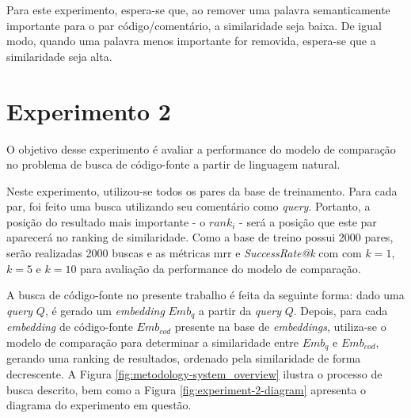 Para este experimento, espera-se que, ao remover uma palavra semanticamente importante para o par código/comentário, a similaridade seja baixa. De igual modo, quando uma palavra menos importante for removida, espera-se que a similaridade seja alta.

\section{Experimento 2}
\label{sec:experiments:experiment-2}
O objetivo desse experimento é avaliar a performance do modelo de comparação no problema de busca de código-fonte a partir de linguagem natural.

Neste experimento, utilizou-se todos os pares da base de treinamento. Para cada par, foi feito uma busca utilizando seu comentário como \textit{query}. Portanto, a posição do resultado mais importante - o $rank_i$ - será a posição que este par aparecerá no ranking de similaridade. Como a base de treino possui 2000 pares, serão realizadas 2000 buscas e as métricas \gls{mrr} e \textit{SuccessRate@k} com com $k=1$, $k=5$ e $k=10$ para avaliação da performance do modelo de comparação.

A busca de código-fonte no presente trabalho é feita da seguinte forma: dado uma \textit{query} $Q$, é gerado um \textit{embedding} $Emb_q$ a partir da \textit{query} $Q$. Depois, para cada \textit{embedding} de código-fonte $Emb_{cod}$ presente na base de \textit{embeddings}, utiliza-se o modelo de comparação para determinar a similaridade entre $Emb_q$ e $Emb_{cod}$, gerando uma ranking de resultados, ordenado pela similaridade de forma decrescente. A Figura \ref{fig:metodology-system_overview} ilustra o processo de busca descrito, bem como a Figura \ref{fig:experiment-2-diagram} apresenta o diagrama do experimento em questão.

